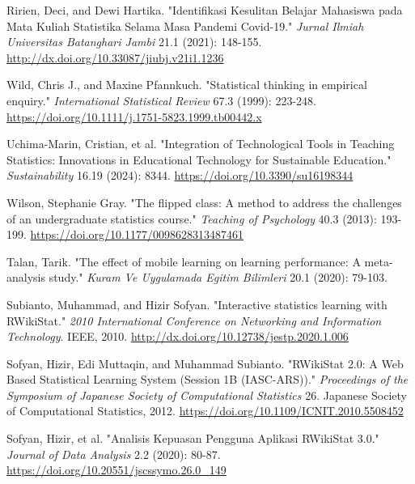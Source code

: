 \documentclass[conference,a4paper]{IEEEtran}
\begin{document}
\balance

\begin{thebibliography}{00}

   Ririen, Deci, and Dewi Hartika. "Identifikasi Kesulitan Belajar Mahasiswa pada Mata Kuliah Statistika Selama Masa Pandemi Covid-19." \textit{Jurnal Ilmiah Universitas Batanghari Jambi} 21.1 (2021): 148-155. \href{http://dx.doi.org/10.33087/jiubj.v21i1.1236}{http://dx.doi.org/10.33087/jiubj.v21i1.1236}

   Wild, Chris J., and Maxine Pfannkuch. "Statistical thinking in empirical enquiry." \textit{International Statistical Review} 67.3 (1999): 223-248. \href{https://doi.org/10.1111/j.1751-5823.1999.tb00442.x}{https://doi.org/10.1111/j.1751-5823.1999.tb00442.x}

   Uchima-Marin, Cristian, et al. "Integration of Technological Tools in Teaching Statistics: Innovations in Educational Technology for Sustainable Education." \textit{Sustainability} 16.19 (2024): 8344. \href{https://doi.org/10.3390/su16198344}{https://doi.org/10.3390/su16198344}

   Wilson, Stephanie Gray. "The flipped class: A method to address the challenges of an undergraduate statistics course." \textit{Teaching of Psychology} 40.3 (2013): 193-199. \href{https://doi.org/10.1177/0098628313487461}{https://doi.org/10.1177/0098628313487461}

   Talan, Tarik. "The effect of mobile learning on learning performance: A meta-analysis study." \textit{Kuram Ve Uygulamada Egitim Bilimleri} 20.1 (2020): 79-103.

   Subianto, Muhammad, and Hizir Sofyan. "Interactive statistics learning with RWikiStat." \textit{2010 International Conference on Networking and Information Technology}. IEEE, 2010. \href{http://dx.doi.org/10.12738/jestp.2020.1.006}{http://dx.doi.org/10.12738/jestp.2020.1.006}

   Sofyan, Hizir, Edi Muttaqin, and Muhammad Subianto. "RWikiStat 2.0: A Web Based Statistical Learning System (Session 1B (IASC-ARS))." \textit{Proceedings of the Symposium of Japanese Society of Computational Statistics} 26. Japanese Society of Computational Statistics, 2012. \href{https://doi.org/10.1109/ICNIT.2010.5508452}{https://doi.org/10.1109/ICNIT.2010.5508452}

   Sofyan, Hizir, et al. "Analisis Kepuasan Pengguna Aplikasi RWikiStat 3.0." \textit{Journal of Data Analysis} 2.2 (2020): 80-87. \href{https://doi.org/10.20551/jscssymo.26.0\_149}{https://doi.org/10.20551/jscssymo.26.0\_149}


\end{thebibliography}
\end{document}
